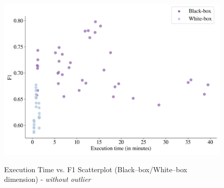 \begin{figure}[H]
    \centering
    \caption{Execution Time vs. F1 Scatterplot (Black--box/White--box dimension) - \textit{without outlier}}\vspace{0.5em}
    \label{fig:scattertimebbwb}\
    \includegraphics[width=140mm]{Figures/Scatterplot_execution_time_F1_wo_outliers_BB_WB.jpg}

    \vspace{-1em}
\end{figure}

